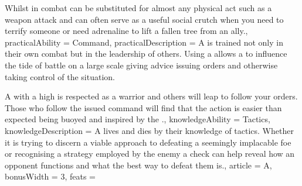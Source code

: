 {Whilst in combat\comma{}  can be substituted for almost any physical act such as a weapon attack\comma{} and can often serve as a useful social crutch when you need to terrify someone\comma{} or need adrenaline to lift a fallen tree from an ally.,
	practicalAbility = Command,
	practicalDescription = A \bname{} is trained not only in their own combat\comma{} but in the leadership of others. Using a  allows a \bname{} to influence the tide of battle on a large scale\comma{} giving advice\comma{} issuing orders and otherwise taking control of the situation. 

A \bname{} with a high  is respected as a warrior\comma{} and others will leap to follow your orders. Those who follow the issued command will find that the action is easier than expected\comma{} being buoyed and inspired by the .,
	knowledgeAbility = Tactics,
	knowledgeDescription = A \bname{} lives and dies by their knowledge of tactics. Whether it is trying to discern a viable approach to defeating a seemingly implacable foe\comma{} or recognising a strategy employed by the enemy\comma{} a  check can help reveal how an opponent functions\comma{} and what the best way to defeat them is.,
	article = A,
	bonusWidth = 3, feats = \WarriorFeats
}


